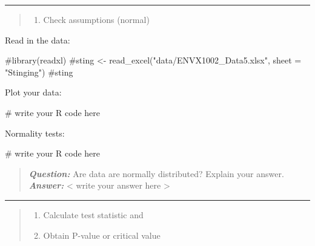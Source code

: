 \documentclass[
  10pt,
  letterpaper,
  DIV=11,
  numbers=noendperiod]{scrartcl}
\newenvironment{Shaded}{\begin{snugshade}}{\end{snugshade}}
\newcommand{\CommentTok}[1]{\textcolor[rgb]{0.37,0.37,0.37}{#1}}
\providecommand{\tightlist}{%
  \setlength{\itemsep}{0pt}\setlength{\parskip}{0pt}}\usepackage{longtable,booktabs,array}
\begin{document}
\begin{center}\rule{0.5\linewidth}{0.5pt}\end{center}

\begin{quote}
\begin{enumerate}
\def\labelenumi{\arabic{enumi}.}
\setcounter{enumi}{2}
\tightlist
\item
  Check assumptions (normal)
\end{enumerate}
\end{quote}

Read in the data:

\begin{Shaded}
\begin{Highlighting}[]
\CommentTok{\#library(readxl)}
\CommentTok{\#sting \textless{}{-} read\_excel("data/ENVX1002\_Data5.xlsx", sheet = "Stinging")}
\CommentTok{\#sting}
\end{Highlighting}
\end{Shaded}

Plot your data:

\begin{Shaded}
\begin{Highlighting}[]
\CommentTok{\# write your R code here}
\end{Highlighting}
\end{Shaded}

Normality tests:

\begin{Shaded}
\begin{Highlighting}[]
\CommentTok{\# write your R code here}
\end{Highlighting}
\end{Shaded}

\begin{quote}
\textbf{\emph{Question:}} Are data are normally distributed? Explain
your answer.\\
\textbf{\emph{Answer:}} \textless{} write your answer here
\textgreater{}
\end{quote}

\begin{center}\rule{0.5\linewidth}{0.5pt}\end{center}

\begin{quote}
\begin{enumerate}
\def\labelenumi{\arabic{enumi}.}
\setcounter{enumi}{3}
\tightlist
\item
  Calculate test statistic and\\
\item
  Obtain P-value or critical value
\end{enumerate}
\end{quote}
\end{document}
